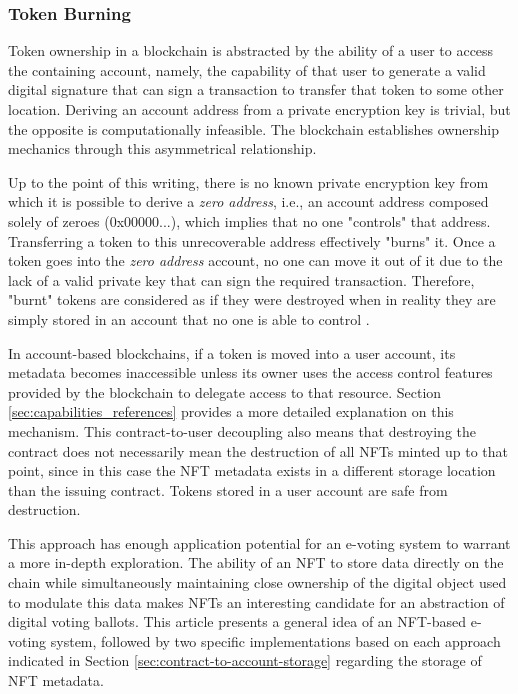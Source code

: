 \documentclass[../3_VotingAndNFTs.tex]{subfiles}
\begin{document}
\subsubsection{Token Burning}
Token ownership in a blockchain is abstracted by the ability of a user to access the containing account, namely, the capability of that user to generate a valid digital signature that can sign a transaction to transfer that token to some other location. Deriving an account address from a private encryption key is trivial, but the opposite is computationally infeasible. The blockchain establishes ownership mechanics through this asymmetrical relationship.
\par
Up to the point of this writing, there is no known private encryption key from which it is possible to derive a \textit{zero address}, i.e., an account address composed solely of zeroes (0x00000...), which implies that no one "controls" that address. Transferring a token to this unrecoverable address effectively "burns" it. Once a token goes into the \textit{zero address} account, no one can move it out of it due to the lack of a valid private key that can sign the required transaction. Therefore, "burnt" tokens are considered as if they were destroyed when in reality they are simply stored in an account that no one is able to control \cite{Antonopoulos2018}.
\par
In account-based blockchains, if a token is moved into a user account, its metadata becomes inaccessible unless its owner uses the access control features provided by the blockchain to delegate access to that resource. Section \ref{sec:capabilities_references} provides a more detailed explanation on this mechanism. This contract-to-user decoupling also means that destroying the contract does not necessarily mean the destruction of all NFTs minted up to that point, since in this case the NFT metadata exists in a different storage location than the issuing contract. Tokens stored in a user account are safe from destruction.
\par
This approach has enough application potential for an e-voting system to warrant a more in-depth exploration. The ability of an NFT to store data directly on the chain while simultaneously maintaining close ownership of the digital object used to modulate this data makes NFTs an interesting candidate for an abstraction of digital voting ballots. This article presents a general idea of an NFT-based e-voting system, followed by two specific implementations based on each approach indicated in Section \ref{sec:contract-to-account-storage} regarding the storage of NFT metadata.
\end{document}
